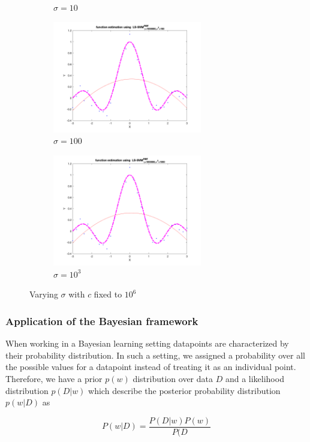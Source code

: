 \documentclass[a4paper, 11pt, one column]{article}
\begin{document}
\begin{figure}[H]
\begin{subfigure}{0.33\linewidth}
            \caption{$\sigma=10$}
        \end{subfigure}\hfil
        \begin{subfigure}{0.33\linewidth}
            \includegraphics[width=6.5cm]{images/sig_100_gamma_10^6.png}
            \caption{$\sigma=100$}
        \end{subfigure}\hfil
        \begin{subfigure}{0.33\linewidth}
            \includegraphics[width=6.5cm]{images/sig_1000_gamma_10^6.png}
            \caption{$\sigma=10^3$}
        \end{subfigure}\hfil
        \caption{Varying $\sigma$ with $c$ fixed to $10^6$}
        \label{fig:sincfixc}
\end{figure}


\subsubsection{Application of the Bayesian framework}
When working in a Bayesian learning setting datapoints are characterized by their probability distribution. In such a setting, we assigned a probability over all the possible values for a datapoint instead of treating it as an individual point. Therefore, we have a prior $p(w)$ distribution over data $D$ and a likelihood distribution $p(D|w)$ which describe the posterior probability distribution $p(w|D)$ as

\begin{equation}
     P(w|D)=\frac{P(D|w)P(w)}{P(D}
\end{equation}
\end{document}
